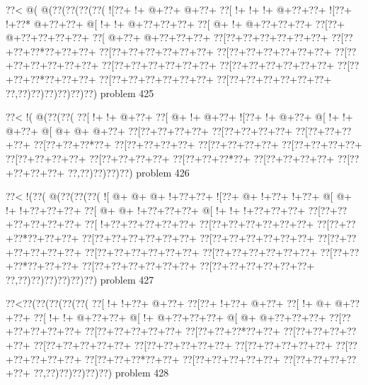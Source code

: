 \vbox{\vbox{\goo
\0??<\- @(\- @(\0??(\0??(\0??(\0??(
\- ![\0??+\- !+\- @+\0??+\- @+\0??+
\0??[\- !+\- !+\- !+\- @+\0??+\0??+
\- ![\0??+\- !+\0??*\- @+\0??+\0??+
\- @[\- !+\- !+\- @+\0??+\0??+\0??+
\0??[\- @+\- !+\- @+\0??+\0??+\0??+
\0??[\0??+\- @+\0??+\0??+\0??+\0??+
\0??[\- @+\0??+\- @+\0??+\0??+\0??+
\0??[\0??+\0??+\0??+\0??+\0??+\0??+
\0??[\0??+\0??+\0??*\0??+\0??+\0??+
\0??[\0??+\0??+\0??+\0??+\0??+\0??+
\0??[\0??+\0??+\0??+\0??+\0??+\0??+
\0??[\0??+\0??+\0??+\0??+\0??+\0??+
\0??[\0??+\0??+\0??+\0??+\0??+\0??+
\0??[\0??+\0??+\0??+\0??+\0??+\0??+
\0??[\0??+\0??+\0??*\0??+\0??+\0??+
\0??[\0??+\0??+\0??+\0??+\0??+\0??+
\0??[\0??+\0??+\0??+\0??+\0??+\0??+
\0??,\0??)\0??)\0??)\0??)\0??)\0??)
}
\hfil problem 425\hfil\break
}

\vbox{\vbox{\goo
\0??<\- !(\- @(\0??(\0??(
\0??[\- !+\- !+\- @+\0??+
\0??[\- @+\- !+\- @+\0??+
\- ![\0??+\- !+\- @+\0??+
\- @[\- !+\- !+\- @+\0??+
\- @[\- @+\- @+\- @+\0??+
\0??[\0??+\0??+\0??+\0??+
\0??[\0??+\0??+\0??+\0??+
\0??[\0??+\0??+\0??+\0??+
\0??[\0??+\0??+\0??*\0??+
\0??[\0??+\0??+\0??+\0??+
\0??[\0??+\0??+\0??+\0??+
\0??[\0??+\0??+\0??+\0??+
\0??[\0??+\0??+\0??+\0??+
\0??[\0??+\0??+\0??+\0??+
\0??[\0??+\0??+\0??*\0??+
\0??[\0??+\0??+\0??+\0??+
\0??[\0??+\0??+\0??+\0??+
\0??,\0??)\0??)\0??)\0??)
}
\hfil problem 426\hfil\break
}

\vbox{\vbox{\goo
\0??<\- !(\0??(\- @(\0??(\0??(\0??(
\- ![\- @+\- @+\- @+\- !+\0??+\0??+
\- ![\0??+\- @+\- !+\0??+\- !+\0??+
\- @[\- @+\- !+\- !+\0??+\0??+\0??+
\0??[\- @+\- @+\- !+\0??+\0??+\0??+
\- @[\- !+\- !+\- !+\0??+\0??+\0??+
\0??[\0??+\0??+\0??+\0??+\0??+\0??+
\0??[\- !+\0??+\0??+\0??+\0??+\0??+
\0??[\0??+\0??+\0??+\0??+\0??+\0??+
\0??[\0??+\0??+\0??*\0??+\0??+\0??+
\0??[\0??+\0??+\0??+\0??+\0??+\0??+
\0??[\0??+\0??+\0??+\0??+\0??+\0??+
\0??[\0??+\0??+\0??+\0??+\0??+\0??+
\0??[\0??+\0??+\0??+\0??+\0??+\0??+
\0??[\0??+\0??+\0??+\0??+\0??+\0??+
\0??[\0??+\0??+\0??*\0??+\0??+\0??+
\0??[\0??+\0??+\0??+\0??+\0??+\0??+
\0??[\0??+\0??+\0??+\0??+\0??+\0??+
\0??,\0??)\0??)\0??)\0??)\0??)\0??)
}
\hfil problem 427\hfil\break
}

\vbox{\vbox{\goo
\0??<\0??(\0??(\0??(\0??(\0??(
\0??[\- !+\- !+\0??+\- @+\0??+
\0??[\0??+\- !+\0??+\- @+\0??+
\0??[\- !+\- @+\- @+\0??+\0??+
\0??[\- !+\- !+\- @+\0??+\0??+
\- @[\- !+\- @+\0??+\0??+\0??+
\- @[\- @+\- @+\0??+\0??+\0??+
\0??[\0??+\0??+\0??+\0??+\0??+
\0??[\0??+\0??+\0??+\0??+\0??+
\0??[\0??+\0??+\0??*\0??+\0??+
\0??[\0??+\0??+\0??+\0??+\0??+
\0??[\0??+\0??+\0??+\0??+\0??+
\0??[\0??+\0??+\0??+\0??+\0??+
\0??[\0??+\0??+\0??+\0??+\0??+
\0??[\0??+\0??+\0??+\0??+\0??+
\0??[\0??+\0??+\0??*\0??+\0??+
\0??[\0??+\0??+\0??+\0??+\0??+
\0??[\0??+\0??+\0??+\0??+\0??+
\0??,\0??)\0??)\0??)\0??)\0??)
}
\hfil problem 428\hfil\break
}

